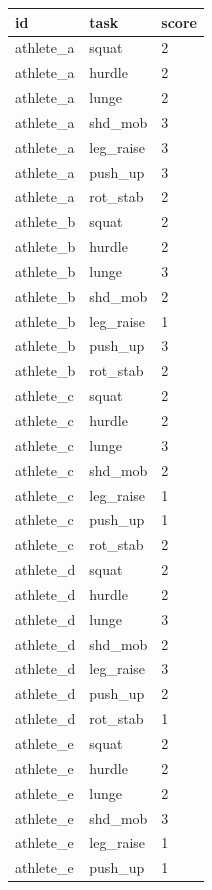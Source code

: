 \documentclass[
]{book}
\begin{document}
\begin{tabular}{l|l|l}
\hline
id & task & score\\
\hline
athlete\_a & squat & 2\\
\hline
athlete\_a & hurdle & 2\\
\hline
athlete\_a & lunge & 2\\
\hline
athlete\_a & shd\_mob & 3\\
\hline
athlete\_a & leg\_raise & 3\\
\hline
athlete\_a & push\_up & 3\\
\hline
athlete\_a & rot\_stab & 2\\
\hline
athlete\_b & squat & 2\\
\hline
athlete\_b & hurdle & 2\\
\hline
athlete\_b & lunge & 3\\
\hline
athlete\_b & shd\_mob & 2\\
\hline
athlete\_b & leg\_raise & 1\\
\hline
athlete\_b & push\_up & 3\\
\hline
athlete\_b & rot\_stab & 2\\
\hline
athlete\_c & squat & 2\\
\hline
athlete\_c & hurdle & 2\\
\hline
athlete\_c & lunge & 3\\
\hline
athlete\_c & shd\_mob & 2\\
\hline
athlete\_c & leg\_raise & 1\\
\hline
athlete\_c & push\_up & 1\\
\hline
athlete\_c & rot\_stab & 2\\
\hline
athlete\_d & squat & 2\\
\hline
athlete\_d & hurdle & 2\\
\hline
athlete\_d & lunge & 3\\
\hline
athlete\_d & shd\_mob & 2\\
\hline
athlete\_d & leg\_raise & 3\\
\hline
athlete\_d & push\_up & 2\\
\hline
athlete\_d & rot\_stab & 1\\
\hline
athlete\_e & squat & 2\\
\hline
athlete\_e & hurdle & 2\\
\hline
athlete\_e & lunge & 2\\
\hline
athlete\_e & shd\_mob & 3\\
\hline
athlete\_e & leg\_raise & 1\\
\hline
athlete\_e & push\_up & 1\\

\end{tabular}
\end{document}
